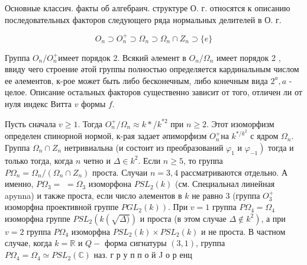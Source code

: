 \documentclass[10pt]{article}
\begin{document}
Основные классич. факты об алгебраич. структуре О. г. относятся к описанию последовательных факторов следующего ряда нормальных делителей в О. г.



\[

O_{n} \supset O_{n}^{+} \supset \Omega_{n} \supset \Omega_{n} \cap Z_{n} \supset\{e\}

\]



Группа $O_{n} / O_{n}^{+}$имеет порядок 2. Всякий әлемент в $O_{n} / \Omega_{n}$ имеет порядок 2 , ввиду чего строение әтой группы полностью определяется кардинальным числом ее әлементов, к-рое может быть либо бесконечным, либо конечным вида $2^{a}, a$ - целое. Описание остальных факторов существенно зависит от того, отличен ли от нуля индекс Витта $v$ формы $f$.



Пусть сначала $v \geqslant 1$. Тогда $O_{n}^{+} / \Omega_{n} \approx k * / k^{* 2}$ при $n \geqslant 2$. Этот изоморфизм определен спинорной нормой, к-рая задает әпиморфизм $O_{n}^{+}$на $k^{* / k^{2}}$ с ядром $\Omega_{n}$. Группа $\Omega_{n} \cap Z_{n}$ нетривиальна (и состоит из преобразований $\varphi_{1}$ и $\left.\varphi_{-1}\right)$ тогда и только тогда, когда $n$ четно и $\Delta \in k^{2}$. Если $n \geqslant 5$, то группа $P \Omega_{n}=\Omega_{n} /\left(\Omega_{n} \cap Z_{n}\right)$ проста. Случаи $n=3,4$ рассматриваются отдельно. А именно, $P \Omega_{3}=$ $=\Omega_{3}$ изоморфона $P S L_{2}(k)$ (см. Специальнал линейная apynna) и также проста, если число әлементов в $k$ не равно 3 (группа $O_{3}^{+}$изоморфна проективной группе $\left.P G L_{2}(k)\right)$. При $v=1$ группа $P \Omega_{4}=\Omega_{4}$ изоморфна группе $P S L_{2}\left(k(\sqrt{\Delta)})\right.$ и проста (в этом случае $\left.\Delta \notin k^{2}\right)$, а при $v=2$ группа $P \Omega_{4}$ изоморфна $P S L_{2}(k) \times P S L_{2}(k)$ и не проста. В частном случае, когда $k=\mathbb{R}$ и $Q-$ форма сигнатуры $(3,1)$, группа $P \Omega_{4}=\Omega_{4} \simeq P S L_{2}(\mathbb{C})$ наз. г р у п п о й J о р енц
\end{document}
